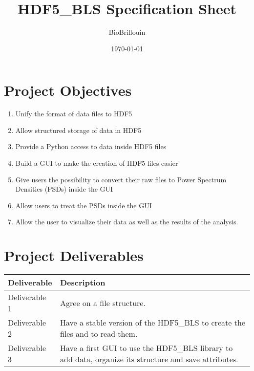 \documentclass{article}
\title{HDF5\_BLS Specification Sheet}
\author{BioBrillouin}
\date{\today}
\begin{document}
\maketitle

\section*{Project Objectives}
\begin{enumerate}
    \item Unify the format of data files to HDF5
    \item Allow structured storage of data in HDF5
    \item Provide a Python access to data inside HDF5 files
    \item Build a GUI to make the creation of HDF5 files easier
    \item Give users the possibility to convert their raw files to Power Spectrum Densities (PSDs) inside the GUI
    \item Allow users to treat the PSDs inside the GUI
    \item Allow the user to visualize their data as well as the results of the analysis.
\end{enumerate}

\section*{Project Deliverables}
\begin{longtable}{|>{\raggedright}p{4cm}|p{10cm}|}
    \hline
    \textbf{Deliverable} & \textbf{Description} \\ \hline
    Deliverable 1 & Agree on a file structure. \\ \hline
    Deliverable 2 & Have a stable version of the HDF5\_BLS to create the files and to read them.  \\ \hline
    Deliverable 3 & Have a first GUI to use the HDF5\_BLS library to add data, organize its structure and save attributes. \\ \hline
\end{longtable}
\end{document}
